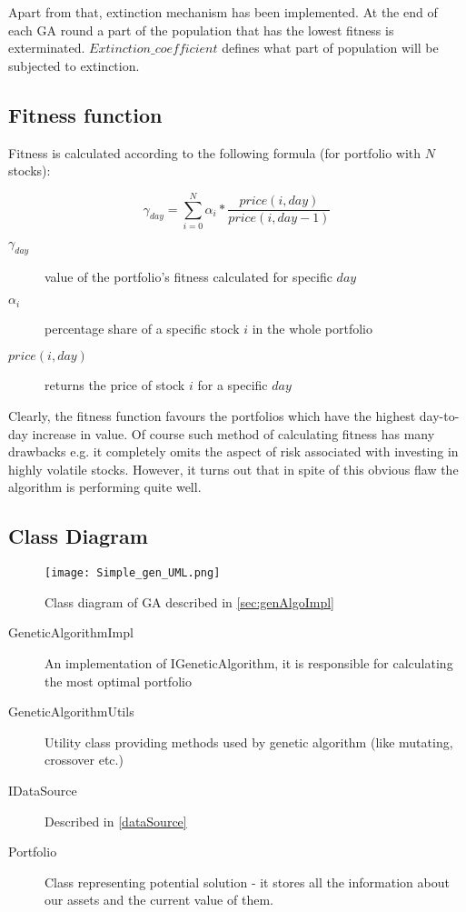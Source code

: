 Apart from that, extinction mechanism has been implemented.
At the end of each GA round a part of the population that has the lowest fitness is exterminated.
$Extinction\_coefficient$ defines what part of population will be subjected to extinction.
 
\subsection{Fitness function}
\label{sec:gen_fitness_fun}

Fitness is calculated according to the following formula (for portfolio with $N$ stocks):

\begin{equation}
    \gamma_{day} =  \sum_{i=0}^{N} {  \alpha_{i} * \frac{price(i,day)}{price(i,day - 1)} }
\end{equation}

\begin{description}
  \item [$\gamma_{day}$] 
      value of the portfolio's fitness calculated for specific $day$
  \item [$\alpha_{i}$]
      percentage share of a specific stock $i$ in the whole portfolio
  \item [$price(i,day)$]
      returns the price of stock $i$ for a specific $day$
\end{description}

Clearly, the fitness function favours the portfolios which have the highest day-to-day increase in value.
Of course such method of calculating fitness has many drawbacks e.g. it completely omits the aspect of risk associated with investing in highly volatile stocks.
However, it turns out that in spite of this obvious flaw the algorithm is performing quite well.  

\subsection{Class Diagram}
\label{gen-class-diagram}

\begin{figure}[H]   
	    \begin{center}
	      \texttt{[image: Simple\_gen\_UML.png]}
	    \end{center}
	    \caption{Class diagram of GA described in \ref{sec:genAlgoImpl}} 
	  \end{figure}

\begin{description}
  \item [GeneticAlgorithmImpl]
    An implementation of IGeneticAlgorithm, it is responsible for calculating the most optimal portfolio
  \item [GeneticAlgorithmUtils]
    Utility class providing methods used by genetic algorithm (like mutating, crossover etc.)
  \item [IDataSource]
    Described in \ref{dataSource}
  \item [Portfolio]
    Class representing potential solution - it stores all the information about our assets and the current value of them.

\end{description}

